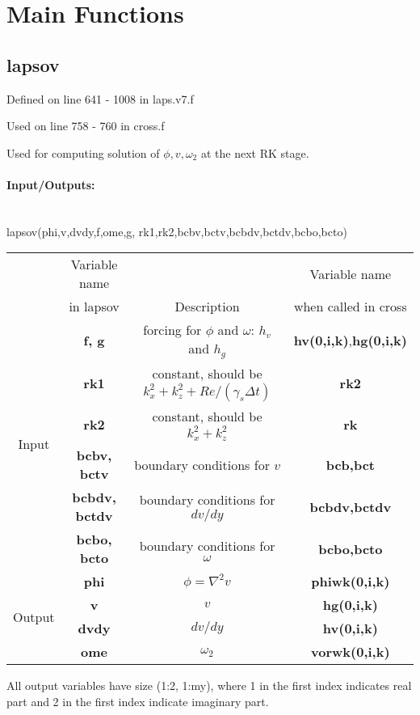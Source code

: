 \documentclass[titlepage,12pt,letter]{article}
\newcommand{\re}{Re}
\numberwithin{equation}{section}
\begin{document}
\newpage
\section{Main Functions}
\subsection{lapsov}
Defined on line 641 - 1008 in laps.v7.f

Used on line 758 - 760 in cross.f

Used for computing solution of $\phi, v, \omega_2$ at the next RK stage.

\paragraph{Input/Outputs:}\phantom{a}\\
lapsov(phi,v,dvdy,f,ome,g, rk1,rk2,bcbv,bctv,bcbdv,bctdv,bcbo,bcto)

\begin{table}[H]
	\centering 
	\renewcommand{\arraystretch}{1.4} 
	\begin{tabular}{c|c|c|c}
		&Variable name &           &Variable name        \\
		&in lapsov       &Description&when called in cross \\ \hline
		\multirow{6}{*}{Input}&\textbf{f, g}&forcing for $\phi$ and $\omega$: $h_v$ and $h_g$&\textbf{hv(0,i,k)},\textbf{hg(0,i,k)}\\
		&\textbf{rk1}&constant, should be $k_x^2+k_z^2+\re/(\gamma_s \Delta t)$ &\textbf{rk2}\\
		&\textbf{rk2}&constant, should be $k_x^2+k_z^2$ &\textbf{rk}\\ 
		&\textbf{bcbv, bctv}&boundary conditions for $v$&\textbf{bcb,bct}\\
		&\textbf{bcbdv, bctdv}&boundary conditions for $dv/dy$&\textbf{bcbdv,bctdv}\\
		&\textbf{bcbo, bcto}&boundary conditions for $\omega$&\textbf{bcbo,bcto}\\
		
		\hline
		
		\multirow{4}{*}{Output}&\textbf{phi}& $\phi = \nabla^2 v$&\textbf{phiwk(0,i,k)}\\
		&\textbf{v}&$v$&\textbf{hg(0,i,k)}\\
		&\textbf{dvdy}&$dv/dy$&\textbf{hv(0,i,k)}\\
		&\textbf{ome}&$\omega_2$&\textbf{vorwk(0,i,k)}\\\hline
	\end{tabular} 
\end{table} 
All output variables have size (1:2, 1:my), where 1 in the first index indicates real part and 2 in the first index indicate imaginary part.
\end{document}
